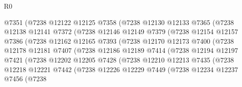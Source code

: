 \begin{lexlean}{R0}
\begin{coremodule}
                    @7351
                    (@7238
                      @12122
                      @12125
                      @7358
                      (@7238
                        @12130
                        @12133
                        @7365
                        (@7238
                          @12138
                          @12141
                          @7372
                          (@7238
                            @12146
                            @12149
                            @7379
                            (@7238
                              @12154
                              @12157
                              @7386
                              (@7238
                                @12162
                                @12165
                                @7393
                                (@7238
                                  @12170
                                  @12173
                                  @7400
                                  (@7238
                                    @12178
                                    @12181
                                    @7407
                                    (@7238
                                      @12186
                                      @12189
                                      @7414
                                      (@7238
                                        @12194
                                        @12197
                                        @7421
                                        (@7238
                                          @12202
                                          @12205
                                          @7428
                                          (@7238
                                            @12210
                                            @12213
                                            @7435
                                            (@7238
                                              @12218
                                              @12221
                                              @7442
                                              (@7238
                                                @12226
                                                @12229
                                                @7449
                                                (@7238
                                                  @12234
                                                  @12237
                                                  @7456
                                                  (@7238

\end{coremodule}
\end{lexlean}
